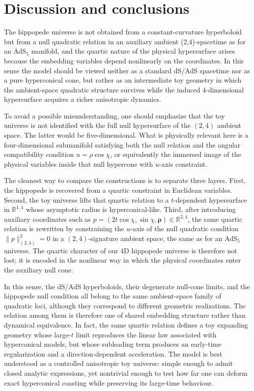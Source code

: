 \documentclass[11pt]{article}
\renewcommand{\vec}[1]{\boldsymbol{#1}}
\begin{document}
\section{Discussion and conclusions}

The hippopede universe is not obtained from a constant-curvature hyperboloid but from a null quadratic relation in an auxiliary ambient (2,4)-spacetime as for an AdS${}_5$ manifold, and the quartic nature of the physical hypersurface arises because the embedding variables depend nonlinearly on the coordinates. In this sense the model should be viewed neither as a standard dS/AdS spacetime nor as a pure hyperconical cone, but rather as an intermediate toy geometry in which the ambient-space quadratic structure survives while the induced 4-dimensional hypersurface acquires a richer anisotropic dynamics.

To avoid a possible misunderstanding, one should emphasize that the toy universe is not identified with the full null hypersurface of the $(2,4)$ ambient space. The latter would be five-dimensional. What is physically relevant here is a four-dimensional submanifold satisfying both the null relation and the angular compatibility condition $u = \rho\cos\chi$, or equivalently the immersed image of the physical variables inside that null hypercone with $u$-axis constraint.

The cleanest way to compare the constructions is to separate three layers. First, the hippopede is recovered from a quartic constraint in Euclidean variables. Second, the toy universe lifts that quartic relation to a $t$-dependent hypersurface in $\mathbb{R}^{1,4}$ whose asymptotic radius is hyperconical-like. Third, after introducing auxiliary coordinates such as $p=(2t\cos\chi,\sin\chi, \vec{\rho}) \in \mathbb{R}^{2,4}$, the same quartic relation is rewritten by constraining the $u$-axis of the null quadratic condition $\|p\|_{\scriptscriptstyle{(2,4)}}^2=0$ in a $(2,4)$-signature ambient space, the same as for an AdS${}_5$ universe. The quartic character of our 4D hippopede universe is therefore not lost; it is encoded in the nonlinear way in which the physical coordinates enter the auxiliary null cone.

In this sense, the dS/AdS hyperboloids, their degenerate null-cone limits, and the hippopede null condition all belong to the same ambient-space family of quadratic loci, although they correspond to different geometric realizations. The relation among them is therefore one of shared embedding structure rather than dynamical equivalence. In fact, the same quartic relation defines a toy expanding geometry whose large-$t$ limit reproduces the linear law associated with hyperconical models, but whose subleading term produces an early-time regularization and a direction-dependent acceleration. The model is best understood as a controlled anisotropic toy universe: simple enough to admit closed analytic expressions, yet nontrivial enough to test how far one can deform exact hyperconical coasting while preserving its large-time behaviour.
\end{document}
